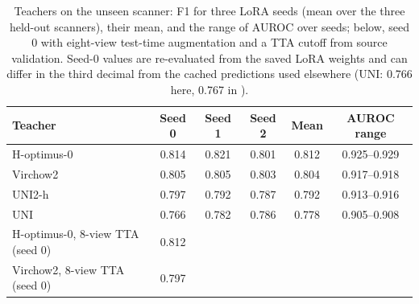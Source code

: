 \begin{table}[htbp]
{\caption{Teachers on the unseen scanner: F1 for three LoRA seeds (mean over the three held-out scanners), their mean, and the range of AUROC over seeds; below, seed 0 with eight-view test-time augmentation and a TTA cutoff from source validation. Seed-0 values are re-evaluated from the saved LoRA weights and can differ in the third decimal from the cached predictions used elsewhere (UNI: 0.766 here, 0.767 in ).}}
{%
\footnotesize
\setlength{\tabcolsep}{5pt}
\begin{tabular}{@{}lccccc@{}}
\toprule
Teacher & Seed 0 & Seed 1 & Seed 2 & Mean & AUROC range \\
\midrule
H-optimus-0 & 0.814 & 0.821 & 0.801 & 0.812 & 0.925--0.929 \\
Virchow2 & 0.805 & 0.805 & 0.803 & 0.804 & 0.917--0.918 \\
UNI2-h & 0.797 & 0.792 & 0.787 & 0.792 & 0.913--0.916 \\
UNI & 0.766 & 0.782 & 0.786 & 0.778 & 0.905--0.908 \\
\midrule
H-optimus-0, 8-view TTA (seed 0) & 0.812 & & & & \\
Virchow2, 8-view TTA (seed 0) & 0.797 & & & & \\
\bottomrule
\end{tabular}
}
\end{table}
